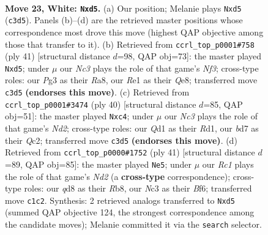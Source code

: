 \documentclass[11pt]{article}
\begin{document}
\begin{figure}[p]\centering
\begin{subfigure}{0.46\textwidth}\centering
\resizebox{\linewidth}{!}{%
\newchessgame
\chessboard[
  setfen={rn1qr1k1/pp1bbppp/8/2PpP3/6P1/P1N3P1/1P1B1P2/1BRQR1K1 w - - 1 23},
  showmover=false,
  pgfstyle=straightmove, color=movearrow, markmove={c3-d5}
]}
\caption{}
\end{subfigure}\hfill
\begin{subfigure}{0.46\textwidth}\centering
\resizebox{\linewidth}{!}{%
\newchessgame
\chessboard[
  setfen={r3q1k1/p2b1rb1/3p1n2/1p1Ppp1p/7P/3BBP2/PP1QN1P1/K1R1R3 b - - 1 21},
  showmover=false,
  pgfstyle=straightmove, color=movearrow, markmove={f6-d5}
]}
\caption{}
\end{subfigure}
\\[4pt]
\begin{subfigure}{0.46\textwidth}\centering
\resizebox{\linewidth}{!}{%
\newchessgame
\chessboard[
  setfen={1r1qr1k1/1bpnbpp1/p3p2p/8/2pP1P1P/2N3P1/P1QNBP2/3RR1K1 w - - 0 21},
  showmover=false,
  pgfstyle=straightmove, color=movearrow, markmove={d2-c4}
]}
\caption{}
\end{subfigure}\hfill
\begin{subfigure}{0.46\textwidth}\centering
\resizebox{\linewidth}{!}{%
\newchessgame
\chessboard[
  setfen={1rq1r1k1/1bpn1pp1/5b1p/p2P4/P1P1p2P/6P1/R2BQPBN/3R2K1 b - - 1 21},
  showmover=false,
  pgfstyle=straightmove, color=movearrow, markmove={d7-e5}
]}
\caption{}
\end{subfigure}
\caption{\textbf{Move 23, White: \texttt{Nxd5}.} (a) Our position; Melanie plays \texttt{Nxd5} (\texttt{c3d5}). Panels (b)--(d) are the retrieved master positions whose correspondence most drove this move (highest QAP objective among those that transfer to it). (b) Retrieved from \texttt{ccrl\_top\_p0001\#758} (ply 41) [structural distance $d$=98, QAP obj=73]: the master played \texttt{Nxd5}; under $\mu$ our \emph{Nc3} plays the role of that game's \emph{Nf3}; cross-type roles: our \emph{P}g3 as their \emph{R}a8, our \emph{R}e1 as their \emph{Q}e8; transferred move \texttt{c3d5} \textbf{(endorses this move)}. (c) Retrieved from \texttt{ccrl\_top\_p0001\#3474} (ply 40) [structural distance $d$=85, QAP obj=51]: the master played \texttt{Nxc4}; under $\mu$ our \emph{Nc3} plays the role of that game's \emph{Nd2}; cross-type roles: our \emph{Q}d1 as their \emph{R}d1, our \emph{b}d7 as their \emph{Q}c2; transferred move \texttt{c3d5} \textbf{(endorses this move)}. (d) Retrieved from \texttt{ccrl\_top\_p0000\#1752} (ply 41) [structural distance $d$=89, QAP obj=85]: the master played \texttt{Ne5}; under $\mu$ our \emph{Rc1} plays the role of that game's \emph{Nd2} (a \textbf{cross-type} correspondence); cross-type roles: our \emph{q}d8 as their \emph{R}b8, our \emph{N}c3 as their \emph{B}f6; transferred move \texttt{c1c2}. Synthesis: 2 retrieved analogs transferred to \texttt{Nxd5} (summed QAP objective 124, the strongest correspondence among the candidate moves); Melanie committed it via the \texttt{search} selector.}
\label{fig:thought-m44}
\end{figure}
\end{document}
